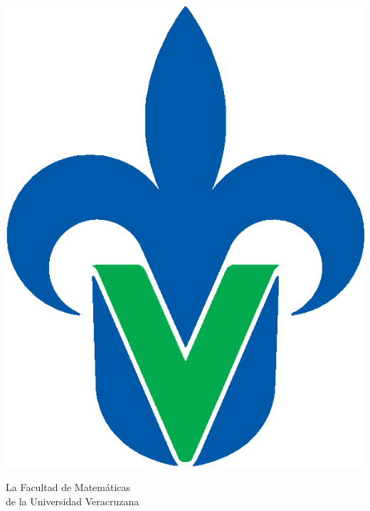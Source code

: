 \documentclass[12pt, landscape]{amsart}
\author{Jesús Mejía}
\begin{document}
\BgThispage
\begin{minipage}{.15\textheight}
\includegraphics[scale=.35]{uv}
\end{minipage}
\begin{minipage}{.7\textheight}
\huge  \sc \centering \color{miazul2}
La Facultad de Matemáticas\\
de la Universidad Veracruzana
\end{minipage}
\end{document}
